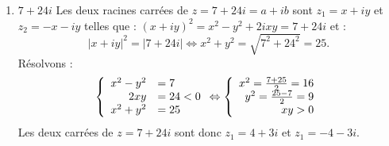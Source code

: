 {{\begin{enumerate}
$$\begin{array} { r l }
	\end{array} \Leftrightarrow \left\{\begin{array}{l}
		x^2=\frac{8+10}{2}=9 \\
		y^2=\frac{10-8}{2}=1 \\
		x y<0
	\end{array}\right.\right.
	$$
	Les deux carrées de $z=8-6 i$ sont donc $z_1=3-i$ et $z_1=-3+i$.
	\item $7+24 i$ Les deux racines carrées de $z=7+24 i=a+i b$ sont $z_1=x+i y$ et $z_2=-x-i y$ telles que : $(x+i y)^2=x^2-y^2+2 i x y=7+24 i$ et :
	$$
	|x+i y|^2=|7+24 i| \Leftrightarrow x^2+y^2=\sqrt{7^2+24^2}=25 .
	$$
	Résolvons :
	$$
	\left\{\begin{array} { r l } 
		{ x ^ { 2 } - y ^ { 2 } } & { = 7 } \\
		{ 2 x y } & { = 2 4 < 0 } \\
		{ x ^ { 2 } + y ^ { 2 } } & { = 2 5 }
	\end{array} \Leftrightarrow \left\{\begin{array}{rl}
		x^2=\frac{7+25}{2}=16 \\
		y^2=\frac{25-7}{2}=9 \\
		x y>0
	\end{array}\right.\right.
	$$
	Les deux carrées de $z=7+24 i$ sont donc $z_1=4+3 i$ et $z_1=-4-3 i$.
	\end{enumerate}
 }}
